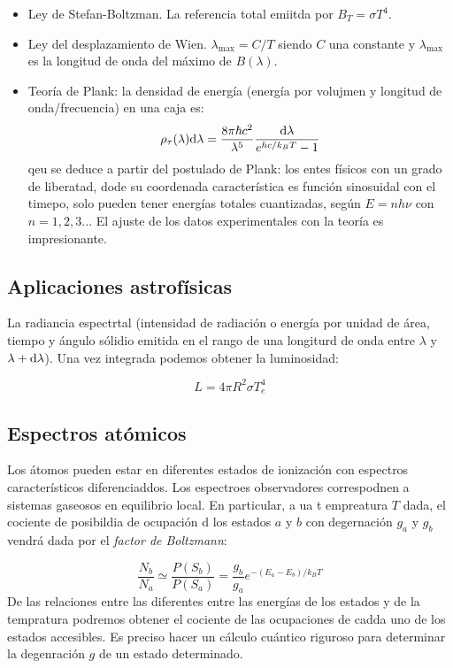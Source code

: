 \begin{itemize}
	\item Ley de Stefan-Boltzman. La referencia total emiitda por $B_T = \sigma T^4$.
	\item Ley del desplazamiento de Wien. $\lambda_{\max} = C / T$ siendo $C$ una constante y $\lambda_{\max}$ es la longitud de onda del máximo de $B(\lambda)$.
	\item Teoría de Plank: la densidad de energía (energía por volujmen y longitud de onda/frecuencia) en una caja es:
	      \begin{equation}
		      \rho_\tau (\lambda) \mathrm{d} \lambda = \frac{8 \pi \hbar c^2}{\lambda^5} \frac{\mathrm{d} \lambda}{e^{hc/k_BT}-1}
	      \end{equation}
	      qeu se deduce a partir del postulado de Plank: los entes físicos con un grado de liberatad, dode su coordenada característica es función sinosuidal con el timepo, solo pueden tener energías totales cuantizadas, según $E=n h \nu$ con $n=1,2,3...$ El ajuste de los datos experimentales con la teoría es impresionante.
\end{itemize}

\subsection{Aplicaciones astrofísicas}

La radiancia espectrtal (intensidad de radiación o energía por unidad de área, tiempo y ángulo sólidio emitida en el rango de una longiturd de onda entre $\lambda$ y $\lambda + \mathrm{d} \lambda$). Una vez integrada podemos obtener la luminosidad:

\begin{equation}
	L = 4 \pi R^2 \sigma T^4_e
\end{equation}

\subsection{Espectros atómicos}

Los átomos pueden estar en diferentes estados de ionización con espectros característicos diferenciaddos. Los espectroes observadores correspodnen a sistemas gaseosos en equilibrio local. En particular, a ua t empreatura $T$ dada, el cociente de posibildia de ocupación d los estados $a$ y $b$ con degernación  $g_a$ y $g_b$ vendrá dada por el \textit{factor de Boltzmann}:

\begin{equation}
	\frac{N_b}{N_a} \simeq \frac{P(S_b)}{P(S_a)} = \frac{g_b}{g_a} e^{-(E_a-E_b)/k_BT}
\end{equation}
De las relaciones entre las diferentes entre las energías de los estados y de la tempratura podremos obtener el cociente de las ocupaciones de cadda uno de los estados accesibles. Es preciso hacer un cálculo cuántico riguroso para determinar la degenración $g$ de un estado determinado.

